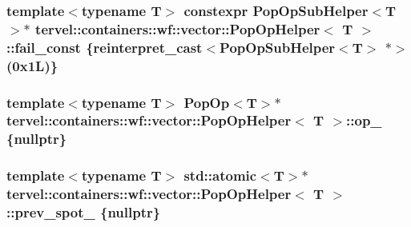 \subsubsection[{fail\+\_\+const}]{\setlength{\rightskip}{0pt plus 5cm}template$<$typename T$>$ constexpr {\bf Pop\+Op\+Sub\+Helper}$<$T$>$$\ast$ {\bf tervel\+::containers\+::wf\+::vector\+::\+Pop\+Op\+Helper}$<$ T $>$\+::fail\+\_\+const \{reinterpret\+\_\+cast$<${\bf Pop\+Op\+Sub\+Helper}$<$T$>$ $\ast$$>$(0x1\+L)\}\hspace{0.3cm}{\ttfamily [static]}}\label{classtervel_1_1containers_1_1wf_1_1vector_1_1_pop_op_helper_a8b5f2f7807984b6a29dbb3b34838eb1f}
\hypertarget{classtervel_1_1containers_1_1wf_1_1vector_1_1_pop_op_helper_ae44349620db471dd999948a01d590bd8}{}
\subsubsection[{op\+\_\+}]{\setlength{\rightskip}{0pt plus 5cm}template$<$typename T$>$ {\bf Pop\+Op}$<$T$>$$\ast$ {\bf tervel\+::containers\+::wf\+::vector\+::\+Pop\+Op\+Helper}$<$ T $>$\+::op\+\_\+ \{nullptr\}\hspace{0.3cm}{\ttfamily [private]}}\label{classtervel_1_1containers_1_1wf_1_1vector_1_1_pop_op_helper_ae44349620db471dd999948a01d590bd8}
\hypertarget{classtervel_1_1containers_1_1wf_1_1vector_1_1_pop_op_helper_a0a2d49f9ffbee73355ae71e3350d28b7}{}
\subsubsection[{prev\+\_\+spot\+\_\+}]{\setlength{\rightskip}{0pt plus 5cm}template$<$typename T$>$ std\+::atomic$<$T$>$$\ast$ {\bf tervel\+::containers\+::wf\+::vector\+::\+Pop\+Op\+Helper}$<$ T $>$\+::prev\+\_\+spot\+\_\+ \{nullptr\}\hspace{0.3cm}{\ttfamily [private]}}\label{classtervel_1_1containers_1_1wf_1_1vector_1_1_pop_op_helper_a0a2d49f9ffbee73355ae71e3350d28b7}
\hypertarget{classtervel_1_1containers_1_1wf_1_1vector_1_1_pop_op_helper_a806490bb4410f0becea1ae1dadd27b33}{}
